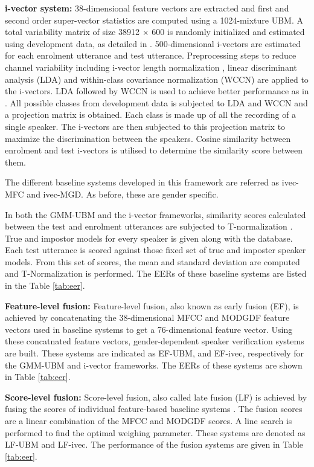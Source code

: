 \documentclass{article}
\begin{document}
\textbf{i-vector system:} 
38-dimensional feature vectors are extracted and first and
 second order super-vector statistics are computed using a
 1024-mixture UBM. A total variability matrix of size 38912
 $\times$ 600 is randomly initialized and estimated using
 development data, as detailed in \cite{dehak_ivector, kenny_JFA}. 
500-dimensional i-vectors are estimated for each enrolment
utterance and test utterance. Preprocessing steps to reduce
channel variability including i-vector length normalization
\cite{garciaRomero}, linear discriminant analysis (LDA) and
within-class covariance normalization (WCCN) are applied to the
i-vectors.%
LDA followed by WCCN is used to achieve better performance as in \cite{dehak_ivector}. 
All possible classes from development data is subjected to LDA and WCCN and a projection
matrix is obtained. Each class is made up of all the recording of a single speaker. The 
i-vectors are then subjected to this projection matrix to maximize the discrimination
between the speakers. Cosine similarity between enrolment and test i-vectors is 
utilised to determine the similarity score between them.

The different baseline systems developed in this framework are referred as
ivec-MFC and ivec-MGD. As before, these are gender specific.

In both the GMM-UBM and the i-vector frameworks, similarity
scores calculated between the test and enrolment utterances 
are subjected to T-normalization \cite{tnorm}. True and impostor
models for every speaker is given along with the database. Each 
test utterance is scored against those fixed set of true and imposter 
speaker models. From this set of scores, the mean and standard
deviation are computed and T-Normalization is performed. The 
EERs of these baseline systems are listed in the Table \ref{tab:eer}.


\textbf{Feature-level fusion:} 
Feature-level fusion, also known as early fusion (EF),
is achieved by concatenating the 38-dimensional MFCC and MODGDF feature vectors 
used in baseline systems to get a 76-dimensional feature vector. Using these
concatnated feature vectors, gender-dependent speaker verification systems
are built. These systems are indicated as EF-UBM, and EF-ivec, respectively for
the GMM-UBM and i-vector frameworks. The EERs of these systems are shown in 
Table  \ref{tab:eer}.

\textbf{Score-level fusion:}  Score-level fusion, also called late fusion (LF)
is achieved by fusing the scores of individual feature-based baseline systems
\cite{fusion}. The fusion scores are a linear combination of the MFCC and MODGDF
scores. A line search is performed to find the optimal weighing parameter. These
systems are denoted as LF-UBM and LF-ivec.  The performance of the fusion
systems are given in Table \ref{tab:eer}. 
\end{document}
